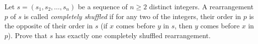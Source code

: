 Let $s=(s_1,s_2,\ldots,s_n)$ be a sequence of $n\ge2$ distinct integers. A rearrangement $p$ of $s$ is called \emph{completely shuffled} if for any two of the integers, their order in $p$ is the opposite of their order in $s$ (if $x$ comes before $y$ in $s$, then $y$ comes before $x$ in $p$). Prove that $s$ has exactly one completely shuffled rearrangement.

